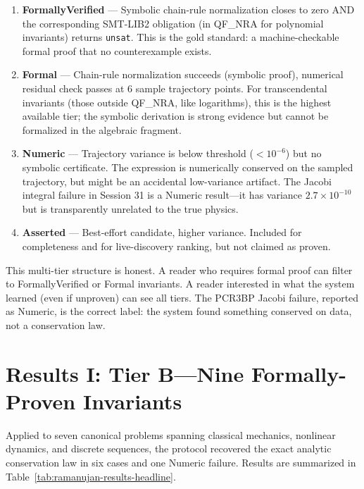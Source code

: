 \begin{definition}
\label{def:verification-tiers}
\begin{enumerate}
  \item \textbf{FormallyVerified} — Symbolic chain-rule normalization closes to zero AND the corresponding SMT-LIB2 obligation (in QF\_NRA for polynomial invariants) returns \texttt{unsat}. This is the gold standard: a machine-checkable formal proof that no counterexample exists.
  
  \item \textbf{Formal} — Chain-rule normalization succeeds (symbolic proof), numerical residual check passes at 6 sample trajectory points. For transcendental invariants (those outside QF\_NRA, like logarithms), this is the highest available tier; the symbolic derivation is strong evidence but cannot be formalized in the algebraic fragment.
  
  \item \textbf{Numeric} — Trajectory variance is below threshold ($< 10^{-6}$) but no symbolic certificate. The expression is numerically conserved on the sampled trajectory, but might be an accidental low-variance artifact. The Jacobi integral failure in Session 31 is a Numeric result---it has variance $2.7 \times 10^{-10}$ but is transparently unrelated to the true physics.
  
  \item \textbf{Asserted} — Best-effort candidate, higher variance. Included for completeness and for live-discovery ranking, but not claimed as proven.
\end{enumerate}
\end{definition}

This multi-tier structure is honest. A reader who requires formal proof can filter to FormallyVerified or Formal invariants. A reader interested in what the system learned (even if unproven) can see all tiers. The PCR3BP Jacobi failure, reported as Numeric, is the correct label: the system found something conserved on data, not a conservation law.

\section{Results I: Tier B---Nine Formally-Proven Invariants}

Applied to seven canonical problems spanning classical mechanics, nonlinear dynamics, and discrete sequences, the protocol recovered the exact analytic conservation law in six cases and one Numeric failure. Results are summarized in Table~\ref{tab:ramanujan-results-headline}.


